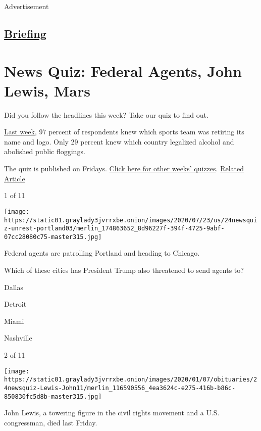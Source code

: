 Advertisement

\hypertarget{-briefing-}{%
\subsection{\texorpdfstring{
\href{/interactive/2018/briefing/global-morning-briefing-newsletter-signup.html}{Briefing}
}{ Briefing }}\label{-briefing-}}

\hypertarget{news-quiz-federal-agents-john-lewis-mars}{%
\section{News Quiz: Federal Agents, John Lewis,
Mars}\label{news-quiz-federal-agents-john-lewis-mars}}

Did you follow the headlines this week? Take our quiz to find out.

\href{https://www.nytimes3xbfgragh.onion/interactive/2020/07/17/briefing/china-twitter-disney-news-quiz.html}{Last
week}, 97 percent of respondents knew which sports team was retiring its
name and logo. Only 29 percent knew which country legalized alcohol and
abolished public floggings.

The quiz is published on Fridays.
\href{https://www.nytimes3xbfgragh.onion/spotlight/news-quiz}{Click here
for other weeks' quizzes}.
\href{https://www.nytimes3xbfgragh.onion/interactive/2020/07/17/briefing/china-twitter-disney-news-quiz.html}{Related
Article}

1 of 11

\texttt{[image: https://static01.graylady3jvrrxbe.onion/images/2020/07/23/us/24newsquiz-unrest-portland03/merlin\_174863652\_8d96227f-394f-4725-9abf-07cc28080c75-master315.jpg]}

Federal agents are patrolling Portland and heading to Chicago.

Which of these cities has President Trump also threatened to send agents
to?

Dallas

Detroit

Miami

Nashville

2 of 11

\texttt{[image: https://static01.graylady3jvrrxbe.onion/images/2020/01/07/obituaries/24newsquiz-Lewis-John11/merlin\_116590556\_4ea3624c-e275-416b-b86c-850830fc5d8b-master315.jpg]}

John Lewis, a towering figure in the civil rights movement and a U.S.
congressman, died last Friday.

